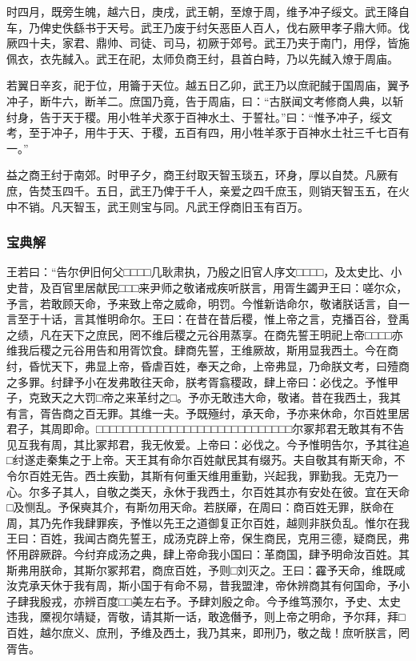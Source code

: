 \documentclass[]{article}
\begin{document}
时四月，既旁生魄，越六日，庚戌，武王朝，至燎于周，维予冲子绥文。武王降自车，乃俾史佚繇书于天号。武王乃废于纣矢恶臣人百人，伐右厥甲孝子鼎大师。伐厥四十夫，家君、鼎帅、司徒、司马，初厥于郊号。武王乃夹于南门，用俘，皆施佩衣，衣先馘入。武王在祀，太师负商王纣，县首白畤，乃以先馘入燎于周庙。

若翼日辛亥，祀于位，用籥于天位。越五日乙卯，武王乃以庶祀馘于国周庙，翼予冲子，断牛六，断羊二。庶国乃竟，告于周庙，曰：``古朕闻文考修商人典，以斩纣身，告于天于稷。用小牲羊犬豕于百神水土、于誓社。''曰：``惟予冲子，绥文考，至于冲子，用牛于天、于稷，五百有四，用小牲羊豕于百神水土社三千七百有一。''

益之商王纣于南郊。时甲子夕，商王纣取天智玉琰五，环身，厚以自焚。凡厥有庶，告焚玉四千。五日，武王乃俾于千人，亲爱之四千庶玉，则销天智玉五，在火中不销。凡天智玉，武王则宝与同。凡武王俘商旧玉有百万。

\hypertarget{header-n163}{%
\subsubsection{宝典解}\label{header-n163}}

王若曰：``告尔伊旧何父□□□□几耿肃执，乃殷之旧官人序文□□□□，及太史比、小史昔，及百官里居献民□□□来尹师之敬诸戒疾听朕言，用胥生蠲尹王曰：嗟尔众，予言，若敢顾天命，予来致上帝之威命，明罚。今惟新诰命尔，敬诸朕话言，自一言至于十话，言其惟明命尔。王曰：在昔在昔后稷，惟上帝之言，克播百谷，登禹之绩，凡在天下之庶民，罔不维后稷之元谷用蒸享。在商先誓王明祀上帝□□□□亦维我后稷之元谷用告和用胥饮食。肆商先誓，王维厥故，斯用显我西土。今在商纣，昏忧天下，弗显上帝，昏虐百姓，奉天之命，上帝弗显，乃命朕文考，曰殪商之多罪。纣肆予小在发弗敢往天命，朕考胥翕稷政，肆上帝曰：必伐之。予惟甲子，克致天之大罚□帝之来革纣之□。予亦无敢违大命，敬诸。昔在我西土，我其有言，胥告商之百无罪。其维一夫。予既殛纣，承天命，予亦来休命，尔百姓里居君子，其周即命。□□□□□□□□□□□□□□□□□□□□□□□□□□□□□尔冢邦君无敢其有不告见互我有周，其比冢邦君，我无攸爱。上帝曰：必伐之。今予惟明告尔，予其往追□纣遂走秦集之于上帝。天王其有命尔百姓献民其有缀艿。夫自敬其有斯天命，不令尔百姓无告。西土疾勤，其斯有何重天维用重勤，兴起我，罪勤我。无克乃一心。尔多子其人，自敬之类天，永休于我西土，尔百姓其亦有安处在彼。宜在天命□及恻乱。予保奭其介，有斯勿用天命。若朕厣，在周曰：商百姓无罪，朕命在周，其乃先作我肆罪疾，予惟以先王之道御复正尔百姓，越则非朕负乱。惟尔在我王曰：百姓，我闻古商先誓王，成汤克辟上帝，保生商民，克用三德，疑商民，弗怀用辟厥辟。今纣弃成汤之典，肆上帝命我小国曰：革商国，肆予明命汝百姓。其斯弗用朕命，其斯尔冢邦君，商庶百姓，予则□刘灭之。王曰：靃予天命，维既咸汝克承天休于我有周，斯小国于有命不易，昔我盟津，帝休辨商其有何国命，予小子肆我殷戎，亦辨百度□□美左右予。予肆刘殷之命。今予维笃滪尔，予史、太史违我，黡视尔靖疑，胥敬，请其斯一话，敢逸僭予，则上帝之明命，予尔拜，拜□百姓，越尔庶义、庶刑，予维及西土，我乃其来，即刑乃，敬之哉！庶听朕言，罔胥告。
\end{document}
